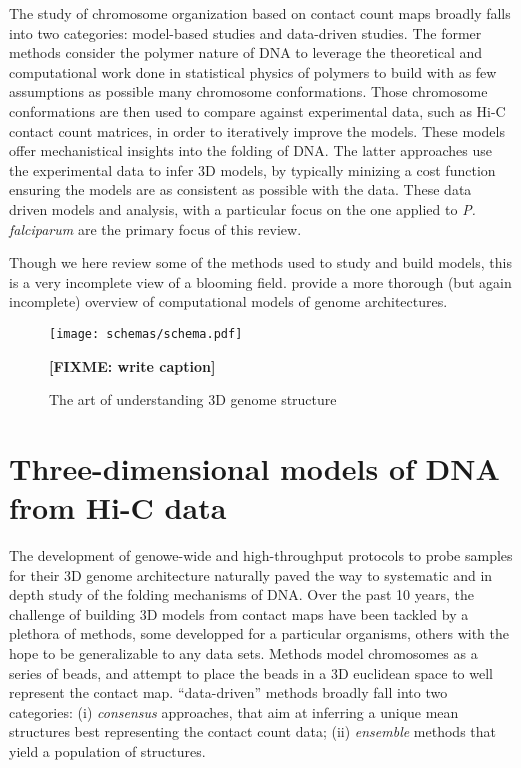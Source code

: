 \documentclass[letterpaper,12pt]{article}
\newcommand{\fixme}[1]{\textbf{[FIXME: #1]}}
\begin{document}
The study of chromosome organization based on contact count maps broadly
falls into two categories: model-based studies and data-driven studies. The
former methods consider the polymer nature of DNA to leverage the theoretical
and computational work done in statistical physics of polymers to build with
as few assumptions as possible many chromosome conformations. Those chromosome
conformations are then used to compare against experimental data, such as Hi-C
contact count matrices, in order to iteratively improve the models. These
models offer mechanistical insights into the folding of DNA. The latter
approaches use the experimental data to infer 3D models, by typically minizing
a cost function ensuring the models are as consistent as possible with the
data. These data driven models and analysis, with a particular focus on the
one applied to {\em P. falciparum} are the primary focus of this
review.


Though we here review some of the methods used to study and build models, this
is a very incomplete view of a blooming field. \citet{rosa:computational}
provide a more thorough (but again incomplete) overview of computational models
of genome architectures.


\begin{figure}
\centering
\texttt{[image: schemas/schema.pdf]}
\caption{The art of understanding 3D genome structure}{
\fixme{write caption}}
\label{Fig1}
\end{figure}


\section*{Three-dimensional models of DNA from Hi-C data}

The development of genowe-wide and high-throughput protocols to probe samples
for their 3D genome architecture naturally paved the way to systematic and in
depth study of the folding mechanisms of DNA. Over the past 10 years, the
challenge of building 3D models from contact maps have been tackled by a
plethora of methods, some developped for a particular organisms, others with
the hope to be generalizable to any data sets. Methods model chromosomes as a
series of beads, and attempt to place the beads in a 3D euclidean space to
well represent the contact map. ``data-driven'' methods broadly fall into two
categories: (i) \textit{consensus} approaches, that aim at inferring a unique
mean structures best representing the contact count data; (ii)
\textit{ensemble} methods that yield a population of structures.
\end{document}
